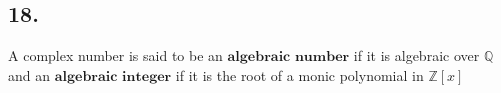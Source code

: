 \documentclass[a4paper, 11pt]{article}
\begin{document}
 \subsection*{18.}
 A complex number is said to be an $\textbf{algebraic number}$ if it is algebraic over $\mathbb{Q}$ and an 
 $\textbf{algebraic integer}$ if it is the root of a monic polynomial in $\mathbb{Z}[x]$


 
\end{document}
